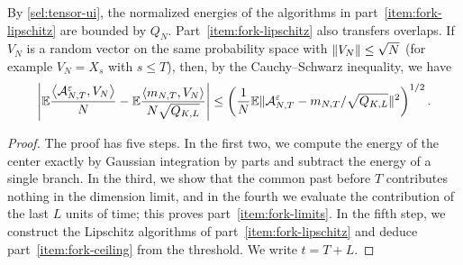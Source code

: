 By \eqref{sel:tensor-ui}, the normalized energies of the algorithms in
part~\ref{item:fork-lipschitz} are bounded by $Q_N$. Part~\ref{item:fork-lipschitz}
also transfers overlaps. If $V_N$ is a random vector on the same probability
space with $\lVert V_N\rVert\le\sqrt N$ (for example $V_N=X_s$ with $s\le T$), then, by the Cauchy--Schwarz inequality, we have
\begin{equation}\label{eq:fork-overlap-transfer}
 \left|\mathbb E\frac{\left\langle\mathcal A^\varepsilon_{N,T},V_N\right\rangle}N
 -\mathbb E\frac{\left\langle m_{N,T},V_N\right\rangle}{N\sqrt{Q_{K,L}}}\right|
 \le\left(\frac1N\mathbb E\lVert\mathcal A^\varepsilon_{N,T}
 -m_{N,T}/\sqrt{Q_{K,L}}\rVert^2\right)^{1/2}.
\end{equation}

\begin{proof}
The proof has five steps. In the first two, we compute the energy of the
center exactly by Gaussian integration by parts and subtract the energy of
a single branch. In the third, we show that the common past before $T$
contributes nothing in the dimension limit, and in the fourth we evaluate
the contribution of the last $L$ units of time; this proves
part~\ref{item:fork-limits}. In the fifth step, we construct the Lipschitz
algorithms of part~\ref{item:fork-lipschitz} and deduce
part~\ref{item:fork-ceiling} from the threshold. We write $t=T+L$.


\end{proof}
